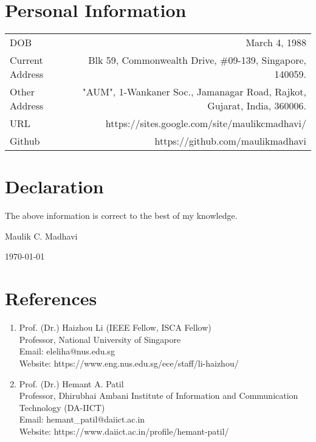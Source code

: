 \documentclass[10pt]{article}
\begin{document}
\section*{Personal Information}
\begin{tabular}{L!{\VRule}R}
	DOB&March 4, 1988\vspace{0.1cm}\\
	Current Address&Blk 59, Commonwealth Drive, \#09-139, Singapore, 140059.\vspace{0.1cm}\\
	Other Address&"AUM", 1-Wankaner Soc., Jamanagar Road, Rajkot, Gujarat, India, 360006.\vspace{0.1cm}\\
	URL&https://sites.google.com/site/maulikcmadhavi/\\
Github&https://github.com/maulikmadhavi\\
\end{tabular} 

\section*{Declaration}
 The above information is correct to the best of my knowledge.
 
\vspace{2cm}
\begin{normalsize}
	\raggedleft
	Maulik C. Madhavi\\
\end{normalsize}
\begin{normalsize}
	\raggedleft	\today	\\
\end{normalsize}

\newpage
\section*{References}
\begin{enumerate}
	\item Prof. (Dr.) Haizhou Li (IEEE Fellow, ISCA Fellow) \\
	Professor, National University of Singapore \\
	Email: eleliha@nus.edu.sg \\	
	Website: https://www.eng.nus.edu.sg/ece/staff/li-haizhou/ \\
	
	\item Prof. (Dr.) Hemant A. Patil \\
	Professor, Dhirubhai Ambani Institute of Information and Communication Technology (DA-IICT)	\\
	Email:  hemant\_patil@daiict.ac.in\\
	Website: https://www.daiict.ac.in/profile/hemant-patil/ \\
\end{enumerate}
\end{document}
